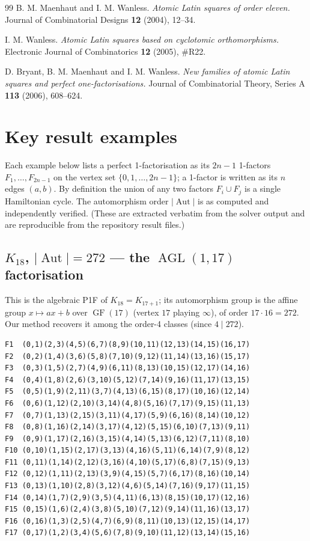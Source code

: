 \documentclass[11pt,reqno]{amsart}
\theoremstyle{plain}
\theoremstyle{definition}
\numberwithin{theorem}{section}
\newcommand{\Aut}{\operatorname{Aut}}
\newcommand{\AGL}{\operatorname{AGL}}
\newcommand{\GF}{\operatorname{GF}}
\begin{document}
\begin{thebibliography}{99}
 B. M. Maenhaut and I. M. Wanless. \emph{Atomic Latin squares of order eleven.}
Journal of Combinatorial Designs \textbf{12} (2004), 12--34.

 I. M. Wanless. \emph{Atomic Latin squares based on cyclotomic orthomorphisms.}
Electronic Journal of Combinatorics \textbf{12} (2005), \#R22.

 D. Bryant, B. M. Maenhaut and I. M. Wanless. \emph{New families of
atomic Latin squares and perfect one-factorisations.} Journal of Combinatorial Theory, Series A
\textbf{113} (2006), 608--624.

\end{thebibliography}

\appendix

\section{Key result examples}

Each example below lists a perfect 1-factorisation as its $2n-1$ 1-factors
$F_1,\dots,F_{2n-1}$ on the vertex set $\{0,1,\dots,2n-1\}$; a 1-factor is written as
its $n$ edges $(a,b)$. By definition the union of any two factors $F_i\cup F_j$ is a
single Hamiltonian cycle. The automorphism order $|\Aut|$ is as computed and
independently verified. (These are extracted verbatim from the solver output and are
reproducible from the repository result files.)

\subsection{$K_{18}$, $|\Aut|=272$ --- the $\AGL(1,17)$ factorisation}

This is the algebraic P1F of $K_{18}=K_{17+1}$; its automorphism group is the affine
group $x\mapsto ax+b$ over $\GF(17)$ (vertex $17$ playing $\infty$), of order
$17\cdot16=272$. Our method recovers it among the order-4 classes (since $4\mid 272$).

{\footnotesize\begin{verbatim}
F1  (0,1)(2,3)(4,5)(6,7)(8,9)(10,11)(12,13)(14,15)(16,17)
F2  (0,2)(1,4)(3,6)(5,8)(7,10)(9,12)(11,14)(13,16)(15,17)
F3  (0,3)(1,5)(2,7)(4,9)(6,11)(8,13)(10,15)(12,17)(14,16)
F4  (0,4)(1,8)(2,6)(3,10)(5,12)(7,14)(9,16)(11,17)(13,15)
F5  (0,5)(1,9)(2,11)(3,7)(4,13)(6,15)(8,17)(10,16)(12,14)
F6  (0,6)(1,12)(2,10)(3,14)(4,8)(5,16)(7,17)(9,15)(11,13)
F7  (0,7)(1,13)(2,15)(3,11)(4,17)(5,9)(6,16)(8,14)(10,12)
F8  (0,8)(1,16)(2,14)(3,17)(4,12)(5,15)(6,10)(7,13)(9,11)
F9  (0,9)(1,17)(2,16)(3,15)(4,14)(5,13)(6,12)(7,11)(8,10)
F10 (0,10)(1,15)(2,17)(3,13)(4,16)(5,11)(6,14)(7,9)(8,12)
F11 (0,11)(1,14)(2,12)(3,16)(4,10)(5,17)(6,8)(7,15)(9,13)
F12 (0,12)(1,11)(2,13)(3,9)(4,15)(5,7)(6,17)(8,16)(10,14)
F13 (0,13)(1,10)(2,8)(3,12)(4,6)(5,14)(7,16)(9,17)(11,15)
F14 (0,14)(1,7)(2,9)(3,5)(4,11)(6,13)(8,15)(10,17)(12,16)
F15 (0,15)(1,6)(2,4)(3,8)(5,10)(7,12)(9,14)(11,16)(13,17)
F16 (0,16)(1,3)(2,5)(4,7)(6,9)(8,11)(10,13)(12,15)(14,17)
F17 (0,17)(1,2)(3,4)(5,6)(7,8)(9,10)(11,12)(13,14)(15,16)
\end{verbatim}}
\end{document}
